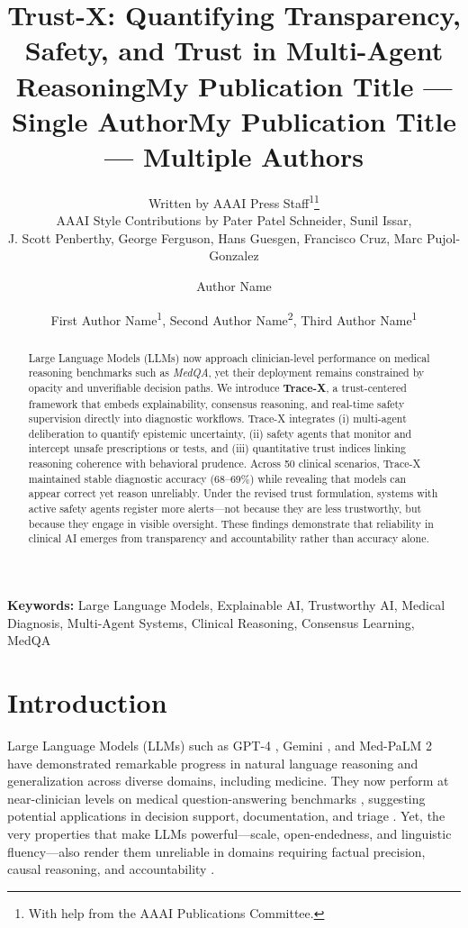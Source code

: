 \documentclass[letterpaper]{article} %
\title{Trust-X: Quantifying Transparency, Safety, and Trust in Multi-Agent Reasoning}
\author{
    Written by AAAI Press Staff\textsuperscript{\rm 1}\thanks{With help from the AAAI Publications Committee.}\\
    AAAI Style Contributions by Pater Patel Schneider,
    Sunil Issar,\\
    J. Scott Penberthy,
    George Ferguson,
    Hans Guesgen,
    Francisco Cruz\equalcontrib,
    Marc Pujol-Gonzalez\equalcontrib
}
\title{My Publication Title --- Single Author}
\author {
    Author Name
}
\title{My Publication Title --- Multiple Authors}
\author {
    First Author Name\textsuperscript{\rm 1},
    Second Author Name\textsuperscript{\rm 2},
    Third Author Name\textsuperscript{\rm 1}
}
\begin{document}
\maketitle

\begin{abstract}
Large Language Models (LLMs) now approach clinician-level performance on medical reasoning benchmarks such as \textit{MedQA}, yet their deployment remains constrained by opacity and unverifiable decision paths. We introduce \textbf{Trace-X}, a trust-centered framework that embeds explainability, consensus reasoning, and real-time safety supervision directly into diagnostic workflows. Trace-X integrates (i) multi-agent deliberation to quantify epistemic uncertainty, (ii) safety agents that monitor and intercept unsafe prescriptions or tests, and (iii) quantitative trust indices linking reasoning coherence with behavioral prudence. Across 50 clinical scenarios, Trace-X maintained stable diagnostic accuracy (68–69\%) while revealing that models can appear correct yet reason unreliably. Under the revised trust formulation, systems with active safety agents register more alerts—not because they are less trustworthy, but because they engage in visible oversight. These findings demonstrate that reliability in clinical AI emerges from transparency and accountability rather than accuracy alone.
\end{abstract}




\textbf{Keywords:} Large Language Models, Explainable AI, Trustworthy AI, Medical Diagnosis, Multi-Agent Systems, Clinical Reasoning, Consensus Learning, MedQA

\section{Introduction}

Large Language Models (LLMs) such as GPT-4 \cite{achiam2023gpt}, Gemini \cite{team2023gemini}, and Med-PaLM 2 \cite{singhal2025toward} have demonstrated remarkable progress in natural language reasoning and generalization across diverse domains, including medicine. They now perform at near-clinician levels on medical question-answering benchmarks \cite{kung2023performance,nori2023capabilities}, suggesting potential applications in decision support, documentation, and triage \cite{lee2023benefits}. Yet, the very properties that make LLMs powerful—scale, open-endedness, and linguistic fluency—also render them unreliable in domains requiring factual precision, causal reasoning, and accountability \cite{ji2023survey,begoli2019need}.
\end{document}
